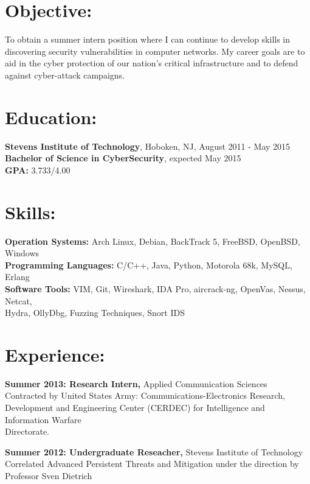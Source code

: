 \documentclass[mm]{res}
\begin{document}
\begin{resume} 
 
\section{Objective:} 
To obtain a summer intern position where I can continue to develop skills in \\ discovering security vulnerabilities in computer networks. My career goals are to aid in the cyber protection of our nation's critical infrastructure and to defend against cyber-attack campaigns.

\section{Education:}
{\bf Stevens Institute of Technology}, Hoboken, NJ, August 2011 - May 2015 \\
{\bf Bachelor of Science in CyberSecurity}, expected May 2015 \\ 
{\bf GPA:} 3.733/4.00

\section{Skills:}
{\bf Operation Systems:} Arch Linux, Debian, BackTrack 5, FreeBSD, OpenBSD, Windows \\
{\bf Programming Languages:} C/C++, Java, Python, Motorola 68k, MySQL, Erlang \\
{\bf Software Tools:} VIM, Git, Wireshark, IDA Pro, aircrack-ng, OpenVas, Nessus, Netcat, \\ 
Hydra, OllyDbg, Fuzzing Techniques, Snort IDS 

\section{Experience:}
 {\bf Summer 2013: Research Intern,} Applied Communication Sciences \\ %
 Contracted by United States Army: Communications-Electronics Research, Development and Engineering Center    (CERDEC) for Intelligence and Information Warfare \\Directorate.
 
{\bf Summer 2012: Undergraduate Reseacher,} Stevens Institute of Technology \\
Correlated Advanced Persistent Threats and Mitigation under the direction by Professor Sven Dietrich


\end{resume}
\end{document}

